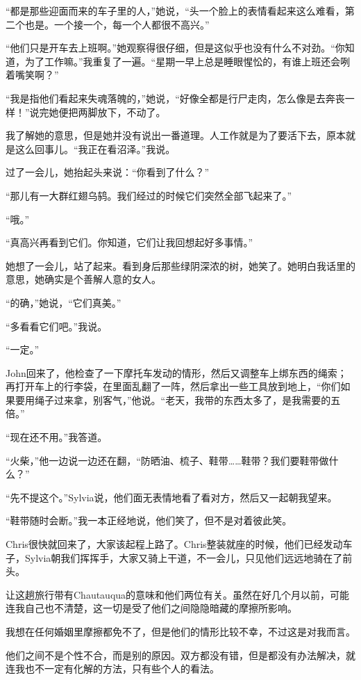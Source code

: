 \documentclass[UTF8]{article}
\begin{document}
\par “都是那些迎面而来的车子里的人，”她说，“头一个脸上的表情看起来这么难看，第二个也是。一个接一个，每一个人都很不高兴。”
\par “他们只是开车去上班啊。”她观察得很仔细，但是这似乎也没有什么不对劲。“你知道，为了工作嘛。”我重复了一遍。“星期一早上总是睡眼惺忪的，有谁上班还会咧着嘴笑啊？”
\par “我是指他们看起来失魂落魄的，”她说，“好像全都是行尸走肉，怎么像是去奔丧一样！”说完她便把两脚放下，不动了。
\par 我了解她的意思，但是她并没有说出一番道理。人工作就是为了要活下去，原本就是这么回事儿。“我正在看沼泽。”我说。
\par 过了一会儿，她抬起头来说：“你看到了什么？”
\par “那儿有一大群红翅乌鸫。我们经过的时候它们突然全部飞起来了。”
\par “哦。”
\par “真高兴再看到它们。你知道，它们让我回想起好多事情。”
\par 她想了一会儿，站了起来。看到身后那些绿阴深浓的树，她笑了。她明白我话里的意思，她确实是个善解人意的女人。
\par “的确，”她说，“它们真美。”
\par “多看看它们吧。”我说。
\par “一定。”
\par John回来了，他检查了一下摩托车发动的情形，然后又调整车上绑东西的绳索；再打开车上的行李袋，在里面乱翻了一阵，然后拿出一些工具放到地上，“你们如果要用绳子过来拿，别客气，”他说。“老天，我带的东西太多了，是我需要的五倍。”
\par “现在还不用。”我答道。
\par “火柴，”他一边说一边还在翻，“防晒油、梳子、鞋带……鞋带？我们要鞋带做什么？”
\par “先不提这个。”Sylvia说，他们面无表情地看了看对方，然后又一起朝我望来。
\par “鞋带随时会断。”我一本正经地说，他们笑了，但不是对着彼此笑。
\par Chris很快就回来了，大家该起程上路了。Chris整装就座的时候，他们已经发动车子，Sylvia朝我们挥挥手，大家又骑上干道，不一会儿，只见他们远远地骑在了前头。
\par 让这趟旅行带有Chautauqua的意味和他们两位有关。虽然在好几个月以前，可能连我自己也不清楚，这一切是受了他们之间隐隐暗藏的摩擦所影响。
\par 我想在任何婚姻里摩擦都免不了，但是他们的情形比较不幸，不过这是对我而言。
\par 他们之间不是个性不合，而是别的原因。双方都没有错，但是都没有办法解决，就连我也不一定有化解的方法，只有些个人的看法。
\end{document}
